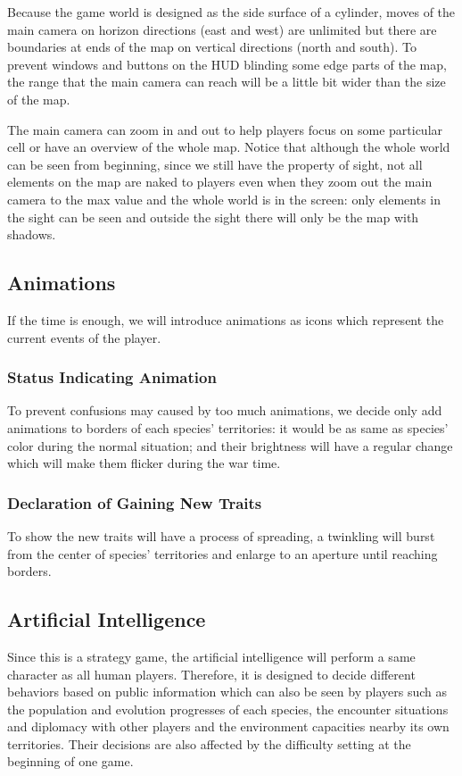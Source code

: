 \documentclass[12pt,a4paper]{article}
\begin{document}
Because the game world is designed as the side surface of a cylinder, moves of the main camera on horizon directions (east and west) are unlimited but there are boundaries at ends of the map on vertical directions (north and south). To prevent windows and buttons on the HUD blinding some edge parts of the map, the range that the main camera can reach will be a little bit wider than the size of the map.

The main camera can zoom in and out to help players focus on some particular cell or have an overview of the whole map. Notice that although the whole world can be seen from beginning, since we still have the property of sight, not all elements on the map are naked to players even when they zoom out the main camera to the max value and the whole world is in the screen: only elements in the sight can be seen and outside the sight there will only be the map with shadows.

\subsection{Animations}
If the time is enough, we will introduce animations as icons which represent the current events of the player.
\subsubsection{Status Indicating Animation}
To prevent confusions may caused by too much animations, we decide only add animations to borders of each species' territories: it would be as same as species' color during the normal situation; and their brightness will have a regular change which will make them flicker during the war time.

\subsubsection{Declaration of Gaining New Traits}
To show the new traits will have a process of spreading, a twinkling will burst from the center of species' territories and enlarge to an aperture until reaching borders.

\subsection{Artificial Intelligence}
Since this is a strategy game, the artificial intelligence will perform a same character as all human players. Therefore, it is designed to decide different behaviors based on public information which can also be seen by players such as the population and evolution progresses of each species, the encounter situations and diplomacy with other players and the environment capacities nearby its own territories. Their decisions are also affected by the difficulty setting at the beginning of one game.
\end{document}
